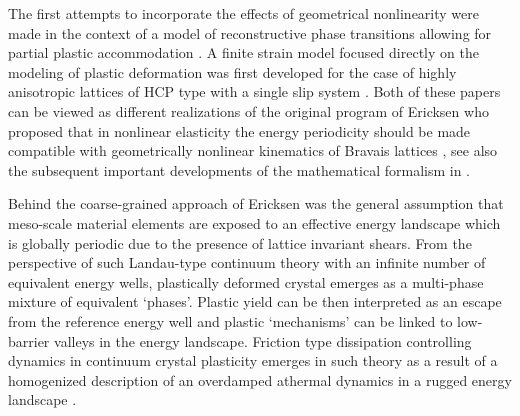 \documentclass[CRPHYS,Unicode,manuscript]{cedram}
\begin{document}
The first attempts to incorporate  the effects   of geometrical nonlinearity were made in the context of a model of reconstructive phase transitions   allowing for partial plastic accommodation  \cite{Conti2004-sv}.  A finite strain model  focused    directly on the modeling of  plastic deformation was first developed for the case of  highly anisotropic  lattices of  HCP type with a single slip system \cite{Salman2011-ij}.  Both of these papers can be viewed as different  realizations of the  original program of   Ericksen  who proposed that in nonlinear elasticity the energy periodicity   should be made compatible with geometrically nonlinear kinematics of Bravais lattices \cite{Ericksen1970-rx, Ericksen1973-yt,Ericksen1977-pj,Ericksen1980-km},  see  also the  subsequent  important  developments of the mathematical formalism in \cite{Parry1976-zt,Folkins1991-em,Parry1998-sv,pitteri2002continuum}.  
 
Behind the coarse-grained  approach of Ericksen was the  general assumption  that meso-scale material elements are exposed to an effective  energy landscape which is globally periodic due to the presence of   lattice invariant shears.
 From the perspective of such Landau-type continuum  theory with an infinite number of  equivalent energy wells,  plastically deformed crystal emerges as   a multi-phase mixture of    equivalent   `phases'.   Plastic yield  can be then    interpreted as  an escape from the    reference  energy well  and   plastic `mechanisms'  can be linked      to  low-barrier valleys in the  energy landscape.  Friction type dissipation controlling dynamics  in continuum crystal plasticity  emerges in such theory as a result of a homogenized description  of an overdamped athermal dynamics in a rugged energy landscape \cite{Puglisi2005-lg,Mielke2011-ck}. 
\end{document}
